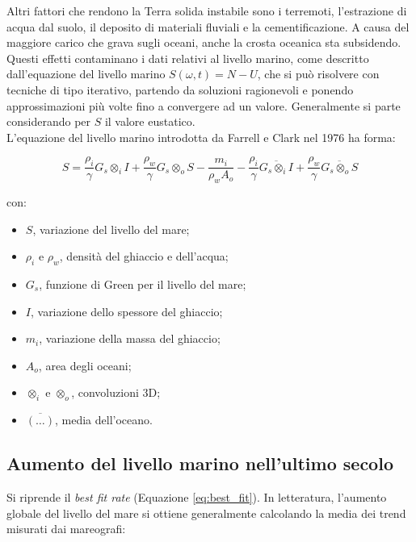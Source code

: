 \documentclass[a4paper,12pt]{book}
\begin{document}
\noindent
Altri fattori che rendono la Terra solida instabile sono i terremoti, l'estrazione di acqua dal suolo, il deposito di materiali fluviali e la cementificazione.
A causa del maggiore carico che grava sugli oceani, anche la crosta oceanica sta subsidendo.\\

\noindent
Questi effetti contaminano i dati relativi al livello marino, come descritto dall'equazione del livello marino $S(\omega, t) = N - U$,
che si può risolvere con tecniche di tipo iterativo, partendo da soluzioni ragionevoli e ponendo approssimazioni più volte fino a convergere ad un valore.
Generalmente si parte considerando per $S$ il valore eustatico.\\

\noindent
L'equazione del livello marino introdotta da Farrell e Clark nel 1976 ha forma:

\begin{equation}
    S = \frac{\rho_i}{\gamma} G_s \otimes_i I +
        \frac{\rho_w}{\gamma} G_s \otimes_o S -
        \frac{m_i}{\rho_w A_o} -
        \frac{\rho_i}{\gamma} \overline{G_s \otimes_i I} +
        \frac{\rho_w}{\gamma} \overline{G_s \otimes_o S}
\end{equation}

\noindent
con:

\begin{itemize}
    \item $S$, variazione del livello del mare;
    \item $\rho_i$ e $\rho_w$, densità del ghiaccio e dell'acqua;
    \item $G_s$, funzione di Green per il livello del mare;
    \item $I$, variazione dello spessore del ghiaccio;
    \item $m_i$, variazione della massa del ghiaccio;
    \item $A_o$, area degli oceani;
    \item $\otimes_i$ e $\otimes_o$, convoluzioni 3D;
    \item $\overline{(\dots)}$, media dell'oceano.
\end{itemize}

\subsection{\textcolor{colore2}{Aumento del livello marino nell'ultimo secolo}}

Si riprende il \textit{best fit rate} (Equazione \ref{eq:best_fit}).
In letteratura, l'aumento globale del livello del mare si ottiene generalmente calcolando la media dei trend misurati dai mareografi:
\end{document}
